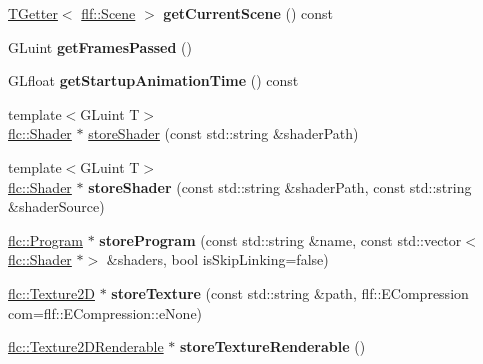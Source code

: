\begin{DoxyCompactItemize}
\hyperlink{classflw_1_1TGetter}{T\+Getter}$<$ \hyperlink{classflw_1_1flf_1_1Scene}{flf\+::\+Scene} $>$ {\bfseries get\+Current\+Scene} () const
\item 
\mbox{\label{classflw_1_1Engine_ad359cfb8982e2dd698a05b1c73eb534a}} 
G\+Luint {\bfseries get\+Frames\+Passed} ()
\item 
\mbox{\label{classflw_1_1Engine_a0fe82ccc72e54182f1156b0300186062}} 
G\+Lfloat {\bfseries get\+Startup\+Animation\+Time} () const
\item 
{\footnotesize template$<$G\+Luint T$>$ }\\\hyperlink{classflw_1_1flc_1_1Shader}{flc\+::\+Shader} $\ast$ \hyperlink{classflw_1_1Engine_a36555136687e9128629e0b2d9a0992d1}{store\+Shader} (const std\+::string \&shader\+Path)
\item 
\mbox{\label{classflw_1_1Engine_a752be0593e2f81094e3af50f0f36079f}} 
{\footnotesize template$<$G\+Luint T$>$ }\\\hyperlink{classflw_1_1flc_1_1Shader}{flc\+::\+Shader} $\ast$ {\bfseries store\+Shader} (const std\+::string \&shader\+Path, const std\+::string \&shader\+Source)
\item 
\mbox{\label{classflw_1_1Engine_a3bb51e3b93edcd143920bf5892e9165a}} 
\hyperlink{classflw_1_1flc_1_1Program}{flc\+::\+Program} $\ast$ {\bfseries store\+Program} (const std\+::string \&name, const std\+::vector$<$ \hyperlink{classflw_1_1flc_1_1Shader}{flc\+::\+Shader} $\ast$$>$ \&shaders, bool is\+Skip\+Linking=false)
\item 
\mbox{\label{classflw_1_1Engine_a7d97dece111c22e168a5262372c460be}} 
\hyperlink{classflw_1_1flc_1_1Texture2D}{flc\+::\+Texture2D} $\ast$ {\bfseries store\+Texture} (const std\+::string \&path, flf\+::\+E\+Compression com=flf\+::\+E\+Compression\+::e\+None)
\item 
\mbox{\label{classflw_1_1Engine_aa99a2c0cd6a324729645ff39a6a3fbc2}} 
\hyperlink{classflw_1_1flc_1_1Texture2DRenderable}{flc\+::\+Texture2\+D\+Renderable} $\ast$ {\bfseries store\+Texture\+Renderable} ()
\item 
\mbox{\label{classflw_1_1Engine_a972d208b867f3e8dc2e22ea785049c70}} 
$$
\end{DoxyCompactItemize}
